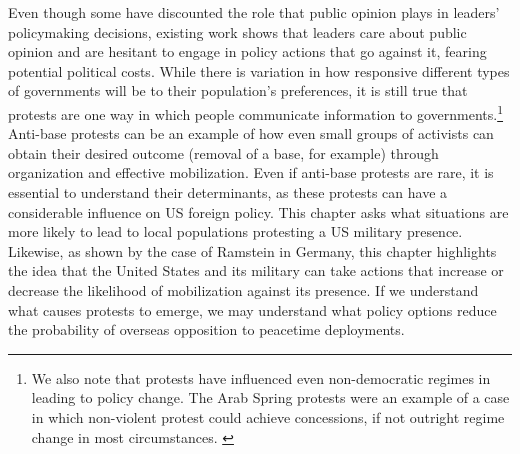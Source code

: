 		
		Even though some have discounted the role that public opinion plays in leaders' policymaking decisions, existing work shows that leaders care about public opinion and are hesitant to engage in policy actions that go against it, fearing potential political costs.\cite{Tomz2018} While there is variation in how responsive different types of governments will be to their population's preferences, it is still true that protests are one way in which people communicate information to governments.\footnote{We also note that protests have influenced even non-democratic regimes in leading to policy change. The Arab Spring protests were an example of a case in which non-violent protest could achieve concessions, if not outright regime change in most circumstances. \cite[See:][]{Chenoweth2013}} Anti-base protests can be an example of how even small groups of activists can obtain their desired outcome (removal of a base, for example) through organization and effective mobilization.\cite{Cooley2008}  Even if anti-base protests are rare, it is essential to understand their determinants, as these protests can have a considerable influence on US foreign policy.  This chapter asks what situations are more likely to lead to local populations protesting a US military presence. Likewise, as shown by the case of Ramstein in Germany, this chapter highlights the idea that the United States and its military can take actions that increase or decrease the likelihood of mobilization against its presence. If we understand what causes protests to emerge, we may understand what policy options reduce the probability of overseas opposition to peacetime deployments.  
		
		
